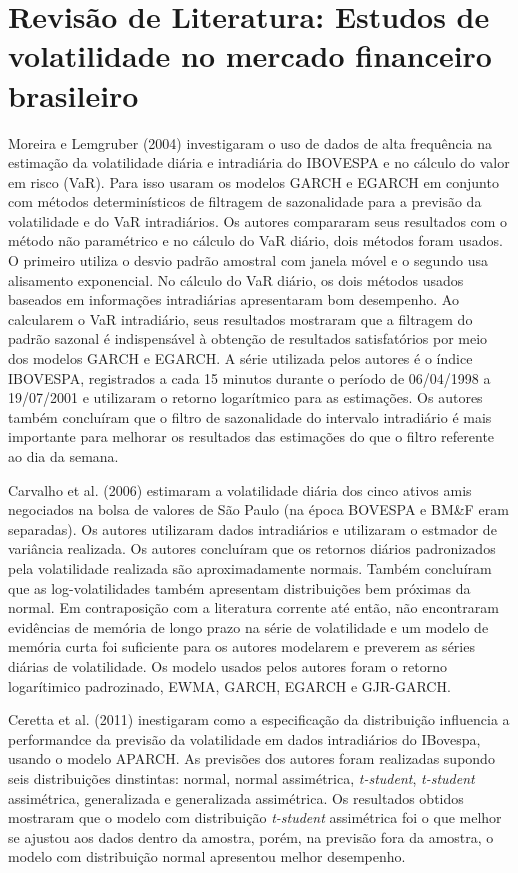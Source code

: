 \documentclass[]{article}
\title{}
\author{}
\date{}
\begin{document}
\section{Revisão de Literatura: Estudos de volatilidade no mercado
financeiro
brasileiro}\label{revisao-de-literatura-estudos-de-volatilidade-no-mercado-financeiro-brasileiro}

Moreira e Lemgruber (2004) investigaram o uso de dados de alta
frequência na estimação da volatilidade diária e intradiária do IBOVESPA
e no cálculo do valor em risco (VaR). Para isso usaram os modelos GARCH
e EGARCH em conjunto com métodos determinísticos de filtragem de
sazonalidade para a previsão da volatilidade e do VaR intradiários. Os
autores compararam seus resultados com o método não paramétrico e no
cálculo do VaR diário, dois métodos foram usados. O primeiro utiliza o
desvio padrão amostral com janela móvel e o segundo usa alisamento
exponencial. No cálculo do VaR diário, os dois métodos usados baseados
em informações intradiárias apresentaram bom desempenho. Ao calcularem o
VaR intradiário, seus resultados mostraram que a filtragem do padrão
sazonal é indispensável à obtenção de resultados satisfatórios por meio
dos modelos GARCH e EGARCH. A série utilizada pelos autores é o índice
IBOVESPA, registrados a cada 15 minutos durante o período de 06/04/1998
a 19/07/2001 e utilizaram o retorno logarítmico para as estimações. Os
autores também concluíram que o filtro de sazonalidade do intervalo
intradiário é mais importante para melhorar os resultados das estimações
do que o filtro referente ao dia da semana.

Carvalho et al. (2006) estimaram a volatilidade diária dos cinco ativos
amis negociados na bolsa de valores de São Paulo (na época BOVESPA e
BM\&F eram separadas). Os autores utilizaram dados intradiários e
utilizaram o estmador de variância realizada. Os autores concluíram que
os retornos diários padronizados pela volatilidade realizada são
aproximadamente normais. Também concluíram que as log-volatilidades
também apresentam distribuições bem próximas da normal. Em contraposição
com a literatura corrente até então, não encontraram evidências de
memória de longo prazo na série de volatilidade e um modelo de memória
curta foi suficiente para os autores modelarem e preverem as séries
diárias de volatilidade. Os modelo usados pelos autores foram o retorno
logarítimico padrozinado, EWMA, GARCH, EGARCH e GJR-GARCH.

Ceretta et al. (2011) inestigaram como a especificação da distribuição
influencia a performandce da previsão da volatilidade em dados
intradiários do IBovespa, usando o modelo APARCH. As previsões dos
autores foram realizadas supondo seis distribuições dinstintas: normal,
normal assimétrica, \emph{t-student}, \emph{t-student} assimétrica,
generalizada e generalizada assimétrica. Os resultados obtidos mostraram
que o modelo com distribuição \emph{t-student} assimétrica foi o que
melhor se ajustou aos dados dentro da amostra, porém, na previsão fora
da amostra, o modelo com distribuição normal apresentou melhor
desempenho.
\end{document}
